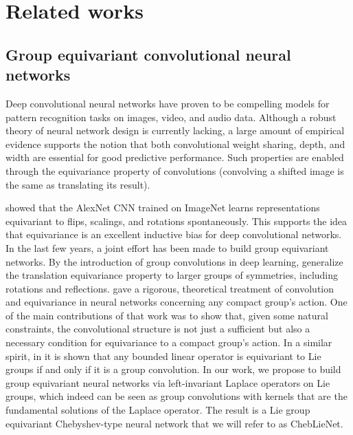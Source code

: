 \documentclass{article}
\begin{document}
\section{Related works} \label{sec:related_works}

\subsection{Group equivariant convolutional neural networks} \label{group_equivaiant_convolutional_neural_networks}

Deep convolutional neural networks \citep{lecun1995convolutional} have proven to be compelling models for pattern recognition tasks on images, video, and audio data. Although a robust theory of neural network design is currently lacking, a large amount of empirical evidence supports the notion that both convolutional weight sharing, depth, and width are essential for good predictive performance. Such properties are enabled through the equivariance property of convolutions (convolving a shifted image is the same as translating its result).

\citet{lenc2015understanding} showed that the AlexNet CNN \citet{krizhevsky2012imagenet} trained on ImageNet learns representations equivariant to flips, scalings, and rotations spontaneously. This supports the idea that equivariance is an excellent inductive bias for deep convolutional networks. In the last few years, a joint effort has been made to build group equivariant networks. By the introduction of group convolutions in deep learning, \citet{cohen2016gcnn} generalize the translation equivariance property to larger groups of symmetries, including rotations and reflections. \citet{kondor2018generalization} gave a rigorous, theoretical treatment of convolution and equivariance in neural networks concerning any compact group's action.  One of the main contributions of that work was to show that, given some natural constraints, the convolutional structure is not just a sufficient but also a necessary condition for equivariance to a compact group's action. In a similar spirit, in \citep{bekkers2019b} it is shown that any bounded linear operator is equivariant to Lie groups if and only if it is a group convolution. In our work, we propose to build group equivariant neural networks via left-invariant Laplace operators on Lie groups, which indeed can be seen as group convolutions with kernels that are the fundamental solutions of the Laplace operator. The result is a Lie group equivariant Chebyshev-type neural network \citep{defferrard2016chebnet} that we will refer to as ChebLieNet.
\end{document}
